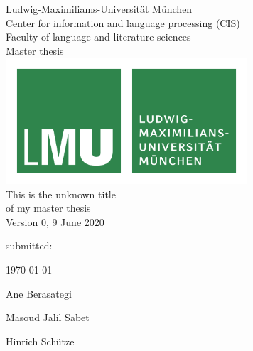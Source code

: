 %
%

\begin{titlepage}
	\begin{center}
		\normalsize
		Ludwig-Maximiliams-Universität München \\
		Center for information and language processing (CIS)  \\
		Faculty of language and literature sciences \\
		\vspace{1cm} %
		\huge
		Master thesis \\
		\vspace{1.5cm}
		\includegraphics[width=9cm]{figures/lmu_logo.png} \\ %
		\vspace{1cm}
		\Large
		This is the unknown title \\
		of my master thesis \\
		\vspace{1cm}
		\tiny Version 0, 9 June 2020
	\end{center}
	\normalsize
	\vfill %
	\begin{labeling}{submitted: }
		\item[submitted:] \today
		\item[by:] Ane Berasategi
		\item[supervisor:] Masoud Jalil Sabet
		\item[supervisor:] Hinrich Schütze
	\end{labeling}
\end{titlepage}

